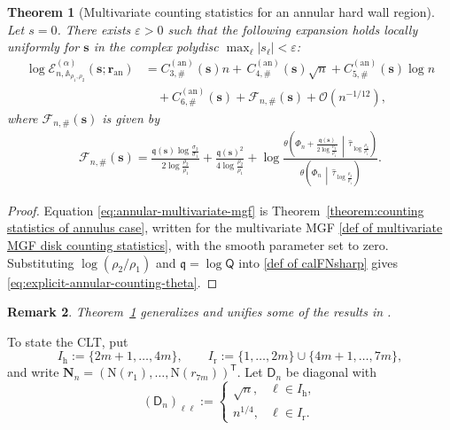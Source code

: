 \documentclass[a4paper]{article}
\newtheorem{theorem}{Theorem}[section]
\newtheorem{remark}[theorem]{Remark}
\numberwithin{equation}{section}
\begin{document}
\begin{theorem}[Multivariate counting statistics for an annular hard wall region]
\label{theorem:annular-multivariate-mgf}
Let $s=0$.
There exists $\varepsilon>0$ such that the following expansion holds locally uniformly for $\boldsymbol s$ in the complex polydisc $\max_\ell|s_\ell|<\varepsilon$:
\begin{align}
\log\mathcal E_{n,\mathbb A_{\rho_1,\rho_2}}^{(\alpha)}
(\boldsymbol s;\boldsymbol r_{\mathrm{an}})
&=C_{3,\#}^{(\mathrm{an})}(\boldsymbol s) n
+\,C_{4,\#}^{(\mathrm{an})}(\boldsymbol s)\sqrt{n}
+C_{5,\#}^{(\mathrm{an})}(\boldsymbol s)\log n
\nonumber\\
&\quad
+C_{6,\#}^{(\mathrm{an})}(\boldsymbol s)
+\mathcal F_{n,\#}(\boldsymbol s)
+\mathcal O(n^{-1/12}),
\label{eq:annular-multivariate-mgf}
\end{align}
where $\mathcal F_{n,\#}(\boldsymbol s)$ is given by
\begin{align}
\mathcal F_{n,\#}(\boldsymbol s)
=\frac{\mathfrak q(\boldsymbol s)\log\frac{\sigma_2}{\sigma_1}}{2\log\frac{\rho_2}{\rho_1}}
+\frac{\mathfrak q(\boldsymbol s)^2}{4\log\frac{\rho_2}{\rho_1}}
+\log\frac{
\theta\!\left(\Phi_n+\frac{\mathfrak q(\boldsymbol s)}{2\log\frac{\rho_2}{\rho_1}}
\,\middle|\,\widehat \tau_{\log\frac{\rho_2}{\rho_1}}\right)}
{\theta\!\left(\Phi_n\,\middle|\,\widehat \tau_{\log\frac{\rho_2}{\rho_1}}\right)}.
\label{eq:explicit-annular-counting-theta}
\end{align}
\end{theorem}

\begin{proof}
Equation \eqref{eq:annular-multivariate-mgf} is
Theorem~\ref{theorem:counting statistics of annulus case}, written for the
multivariate MGF \eqref{def of multivariate MGF disk counting statistics}, with the smooth
parameter set to zero.  Substituting
$\log(\rho_2/\rho_1)$ and $\mathfrak q=\log\mathsf Q$ into
\eqref{def of calFNsharp} gives
\eqref{eq:explicit-annular-counting-theta}.  
\end{proof}

\begin{remark}
Theorem~\ref{theorem:annular-multivariate-mgf} generalizes and unifies some of the results in \cite{CL2023,ACCL1,ACCL2}.    
\end{remark}


To state the CLT, put
\begin{equation}
I_{\mathrm h}:=\{2m+1,\ldots,4m\},
\qquad
I_{\mathrm r}:=\{1,\ldots,2m\}\cup\{4m+1,\ldots,7m\},
\end{equation}
and write
$\boldsymbol N_n=(\mathrm N(r_1),\ldots,\mathrm N(r_{7m}))^{\mathsf T}$.
Let $\mathsf D_n$ be diagonal with
\begin{equation}
(\mathsf D_n)_{\ell\ell}
:=\begin{cases}
\sqrt n,&\ell\in I_{\mathrm h},\\
n^{1/4},&\ell\in I_{\mathrm r}.
\end{cases}
\label{def:annular-counting-normalization}
\end{equation}
\end{document}

